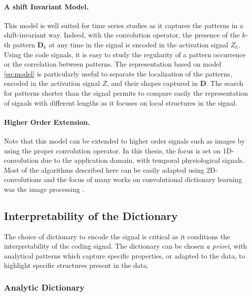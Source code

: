 \documentclass[../thesis.tex]{subfiles}
\begin{document}
\paragraph{A shift Invariant Model.}
\label{par:shift_inv}

	This model is well suited for time series studies as it captures the
	patterns in a shift-invariant way. Indeed, with the convolution operator,
	the presence of the $k$-th pattern ${\pmb D}_k$ at any time in the signal is encoded
	in the activation signal $Z_k$. Using the code signals, it is easy to study
	the regularity of a pattern occurrence or the correlation between patterns.
	The representation based on model \autoref{eq:model} is particularly useful
	to separate the localization of the patterns, encoded in the activation signal
	$Z$, and their shapes captured in $\pmb D$. The search for patterns shorter
	than the signal permits to compare easily the representation of signals with
	different lengths as it focuses on local structures in the signal.


\paragraph{Higher Order Extension.}
\label{par:extension}
	Note that this model can be extended to higher order signals such as images by
	using the proper convolution operator. In this thesis, the focus is set on
	1D-convolution due to the application domain, with temporal physiological signals.
	Most of the algorithms described here can be easily adapted using 2D-convolutions
	and the focus of many works on convolutional dictionary learning was the image
	processing \citep{Bristow2013,Chalasani2013, Kavukcuoglu2013}.



\subsection{Interpretability of the Dictionary}
\label{sub:chose_dict}

	The choice of dictionary to encode the signal is critical as it conditions
	the interpretability of the coding signal. The dictionary can be chosen
	\textit{a priori}, with analytical patterns which capture specific properties,
	or adapted to the data, to highlight specific structures present in the data.

\subsubsection{Analytic Dictionary}
\label{ssub:analytic_dict}
\end{document}
